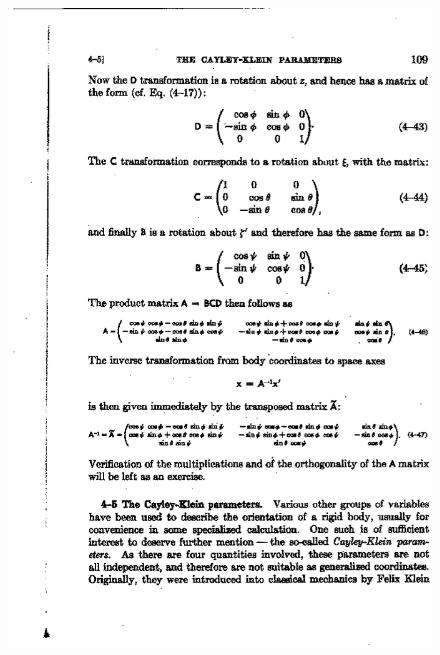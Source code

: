 \documentclass[11pt,preprint]{aastex}
\begin{document}
\begin{figure}
\includegraphics[width=7.0in] {page109.ps}
\end{figure}  
\end{document}

